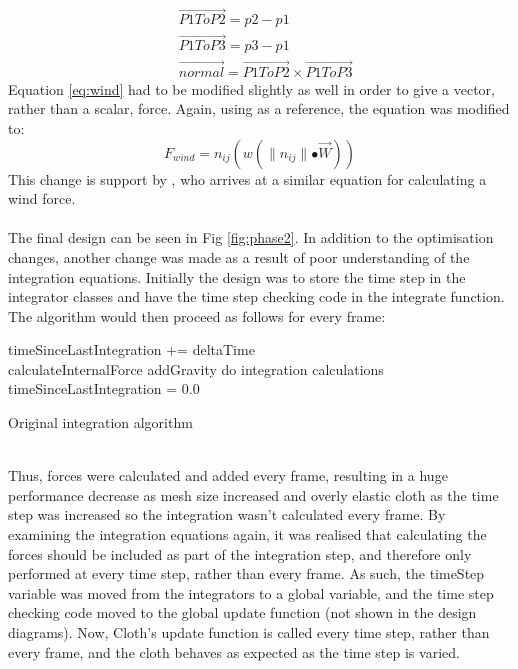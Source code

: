 \begin{equation}
\begin{split}
  &\overrightarrow{P1ToP2} = p2 - p1
  \\&\overrightarrow{P1ToP3} = p3 - p1
  \\&\overrightarrow{normal} = \overrightarrow{P1ToP2} \times \overrightarrow{P1ToP3}
\end{split}
\end{equation}
Equation \ref{eq:wind} had to be modified slightly as well in order to give a vector, rather than a scalar, force. Again, using \textcite{Mosegaard2009} as a reference, the equation was modified to:
\begin{equation}
F_{wind} = n_{ij}(w(\parallel n_{ij}\parallel\bullet\overrightarrow{W}))
\end{equation}
This change is support by \textcite[3]{Provot2001}, who arrives at a similar equation for calculating a wind force.
\\\\The final design can be seen in Fig \ref{fig:phase2}. In addition to the optimisation changes, another change was made as a result of poor understanding of the integration equations. Initially the design was to store the time step in the integrator classes and have the time step checking code in the integrate function. The algorithm would then proceed as follows for every frame:
\begin{algorithm}[h]
  \SetAlgoLined
  \SetNoFillComment
  timeSinceLastIntegration += deltaTime
  \\ {
    calculateInternalForce
  }
   {
    addGravity
  }
   {
     {
      do integration calculations
    }
    timeSinceLastIntegration = 0.0
  }
  \caption{Original integration algorithm}
\end{algorithm}
\\Thus, forces were calculated and added every frame, resulting in a huge performance decrease as mesh size increased and overly elastic cloth as the time step was increased so the integration wasn't calculated every frame. By examining the integration equations again, it was realised that calculating the forces should be included as part of the integration step, and therefore only performed at every time step, rather than every frame. As such, the timeStep variable was moved from the integrators to a global variable, and the time step checking code moved to the global update function (not shown in the design diagrams). Now, Cloth's update function is called every time step, rather than every frame, and the cloth behaves as expected as the time step is varied.

